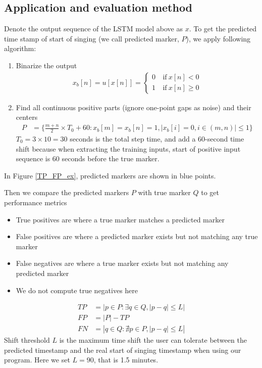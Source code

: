 \documentclass{article}
\begin{document}
    \subsection{Application and evaluation method}
    Denote the output sequence of the LSTM model above as $x$. To get the predicted time stamp of start of singing (we call predicted marker, $P$), we apply following algorithm:
    \begin{enumerate}
        \item Binarize the output
            \begin{align}
                x_b[n] = u[x[n]] = \left\{\begin{aligned}
                    0\ &\mathrm{if}\ x[n] < 0 \\
                    1\ &\mathrm{if}\ x[n] \ge 0
                \end{aligned} \right.
            \end{align}
        \item Find all continuous positive parts (ignore one-point gaps as noise) and their centers
        \begin{align}
            P &= \{ \frac{m+n}{2} \times T_0 + 60: x_b[m]=x_b[n]=1, |x_b[i]=0, i \in (m,n)| \le 1\}
        \end{align}
        $T_0 = 3 \times 10 =30$ seconds is the total step time, and add a 60-second time shift because when extracting the training inputs, start of positive input sequence is 60 seconds before the true marker. 
    \end{enumerate}

    In Figure \ref{TP_FP_ex}, predicted markers are shown in blue points.
    
    Then we compare the predicted markers $P$ with true marker $Q$ to get performance metrics
    \begin{itemize}
        \item True positives are where a true marker matches a predicted marker
        \item False positives are where a predicted marker exists but not matching any true marker 
        \item False negatives are where a true marker exists but not matching any predicted marker
        \item We do not compute true negatives here 
    \end{itemize}
    \begin{align}
        TP &= |{p \in P: \exists q \in Q, |p-q| \le L}| \\
        FP &= |P|-TP \\
        FN &= |{q \in Q: \nexists p \in P, |p-q| \le L}|
    \end{align}
    Shift threshold $L$ is the maximum time shift the user can tolerate between the predicted timestamp and the real start of singing timestamp when using our program. Here we set $L=90$, that is 1.5 minutes.
\end{document}
